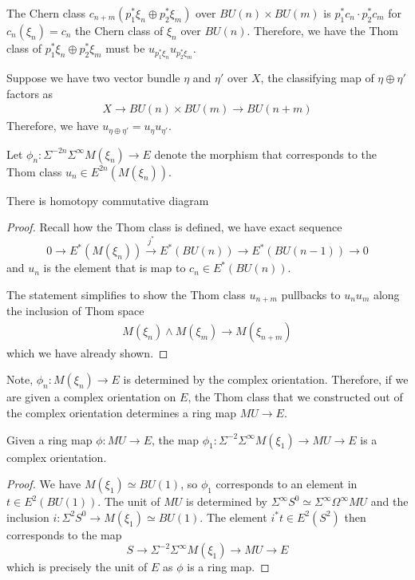 The Chern class $c_{n+m}(p_1^*\xi_n\oplus p_2^*\xi_m)$ over $BU(n)\times BU(m)$ is $p_1^*c_n \cdot p^*_2c_m$ for $c_n(\xi_n)=c_n$ the Chern class of $\xi_n$ over $BU(n)$. Therefore, we have the Thom class of $p_1^*\xi_n\oplus p_2^*\xi_m$ must be $u_{p^*_1\xi_n}u_{p_2^*\xi_m}$.

Suppose we have two vector bundle $\eta$ and $\eta'$ over $X$, the classifying map of $\eta\oplus \eta'$ factors as
\begin{align*}
 X\to BU(n)\times BU(m)\to BU(n+m)
\end{align*}
Therefore, we have $u_{\eta\oplus \eta'}=u_{\eta}u_{\eta'}$.


Let $\phi_n: \Sigma^{-2n}\Sigma^\infty M(\xi_{n})\to E$ denote the morphism that corresponds to the Thom class $u_n\in E^{2n}(M(\xi_n))$.

\begin{proposition}
There is homotopy commutative diagram
\begin{center}
\end{center}
\end{proposition}
\begin{proof}
Recall how the Thom class is defined, we have exact sequence
\[
    0\to E^{*}(M(\xi_n))\xrightarrow{j^*} E^*(BU(n))\to E^*(BU(n-1))\to 0
\]and $u_n$ is the element that is map to $c_n\in E^*(BU(n))$.

The statement simplifies to show the Thom class $u_{n+m}$ pullbacks to $u_{n}u_m$ along the inclusion of Thom space
\begin{align*}
   M(\xi_n)\wedge M(\xi_m)\to M(\xi_{n+m})
\end{align*}which we have already shown.
\end{proof}

Note, $\phi_n:M(\xi_n)\to E$ is determined by the complex orientation. Therefore, if we are given a complex orientation on $E$, the Thom class that we constructed out of the complex orientation determines a ring map $MU\to E$.

\begin{proposition}
    Given a ring map $\phi:MU\to E$, the map $\phi_1: \Sigma^{-2}\Sigma^\infty M(\xi_1)\to MU\to E$ is a complex orientation.
\end{proposition}
\begin{proof}
    We have $M(\xi_1)\simeq BU(1)$, so $\phi_1$ corresponds to an element in $t\in E^2(BU(1))$. The unit of $MU$ is determined by $\Sigma^\infty S^0\simeq \Sigma^\infty \Omega^\infty MU$ and the inclusion $i:\Sigma^2S^0\to M(\xi_1)\simeq BU(1)$.  The element $i^*t\in E^2(S^2)$ then corresponds to the map 
    \[
     S\to \Sigma^{-2}\Sigma^\infty M(\xi_1)\to MU\to E
    \]which is precisely the unit of $E$ as $\phi$ is a ring map.
\end{proof}

